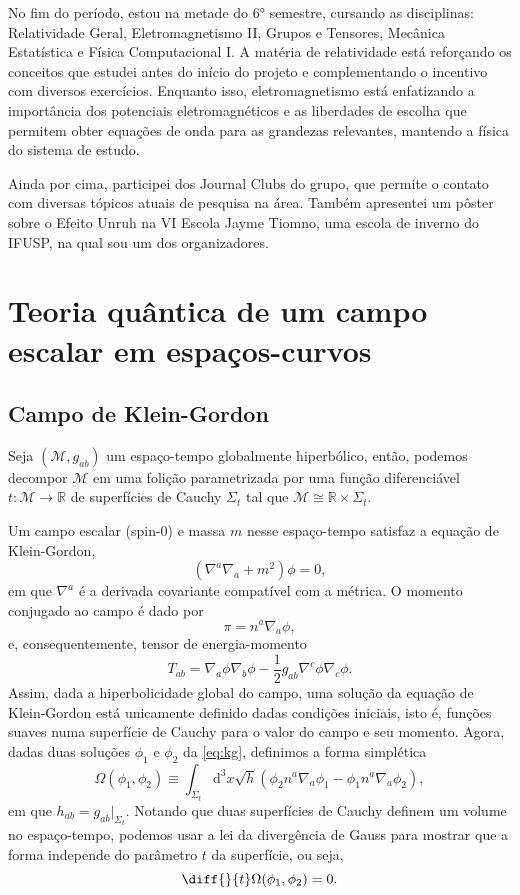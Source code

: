 \documentclass[12pt]{article}
\newcommand{\m}{\mathcal{M}}
\newcommand{\kg}{\left(\nabla^a\nabla_a+m^2\right)}
\newcommand{\dd}{\mathrm{d}}
\begin{document}
No fim do período, estou na metade do 6° semestre, cursando as disciplinas: Relatividade Geral, Eletromagnetismo II, Grupos e Tensores, Mecânica Estatística e Física Computacional I. A matéria de relatividade está reforçando os conceitos que estudei antes do início do projeto e complementando o incentivo com diversos exercícios. Enquanto isso, eletromagnetismo está enfatizando a importância dos potenciais eletromagnéticos e as liberdades de escolha que permitem obter equações de onda para as grandezas relevantes, mantendo a física do sistema de estudo.

Ainda por cima, participei dos Journal Clubs do grupo, que permite o contato com diversas tópicos atuais de pesquisa na área. Também apresentei um pôster sobre o Efeito Unruh na VI Escola Jayme Tiomno, uma escola de inverno do IFUSP, na qual sou um dos organizadores.

\section{Teoria quântica de um campo escalar em espaços-curvos}
\subsection*{Campo de Klein-Gordon}
Seja \((\m,g_{ab})\) um espaço-tempo globalmente hiperbólico, então, podemos decompor \(\m\) em uma folição parametrizada por uma função diferenciável \(t:\m\to\mathbb{R}\) de superfícies de Cauchy \(\Sigma_t\) tal que \(\m\cong\mathbb{R}\times\Sigma_t\).

Um campo escalar (spin-0) e massa \(m\) nesse espaço-tempo satisfaz a equação de Klein-Gordon,
\begin{equation}
    \kg\phi=0,
    \label{eq:kg}
\end{equation}
em que \(\nabla^a\) é a derivada covariante compatível com a métrica. O momento conjugado ao campo é dado por
\begin{equation}
    \pi=n^a\nabla_a\phi,
\end{equation}
e, consequentemente, tensor de energia-momento
\begin{equation}
    T_{ab}=\nabla_a\phi\nabla_b\phi-\frac{1}{2}g_{ab}\nabla^c\phi\nabla_c\phi.
\end{equation}
Assim, dada a hiperbolicidade global do campo, uma solução da equação de Klein-Gordon está unicamente definido dadas condições iniciais, isto é, funções suaves numa superfície de Cauchy para o valor do campo e seu momento.
Agora, dadas duas soluções \(\phi_1\) e \(\phi_2\) da \cref{eq:kg}, definimos a forma simplética
\begin{equation}
    \Omega(\phi_1,\phi_2)\equiv\int_{\Sigma_t}\dd^3x\sqrt{h}\left(\phi_2n^a\nabla_a\phi_1-\phi_1n^a\nabla_a\phi_2\right),
\end{equation}
em que \(h_{ab}=g_{ab}\vert_{\Sigma_t}\). Notando que duas superfícies de Cauchy definem um volume no espaço-tempo, podemos usar a lei da divergência de Gauss para mostrar que a forma independe do parâmetro \(t\) da superfície, ou seja,
\begin{equation}
    \diff{}{t}\Omega(\phi_1,\phi_2)=0.
\end{equation}
\end{document}
